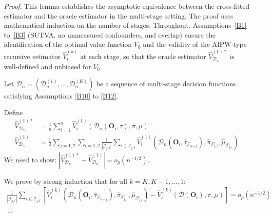 \documentclass[11pt]{article}
\theoremstyle{referenceplain}
\theoremstyle{referencedefinition}
\theoremstyle{referenceremark}
\begin{document}
\begin{proof}
This lemma establishes the asymptotic equivalence between the cross-fitted estimator and the oracle estimator in the multi-stage setting. The proof uses mathematical induction on the number of stages. Throughout, Assumptions~\ref{B1} to~\ref{B3} (SUTVA, no unmeasured confounders, and overlap) ensure the identification of the optimal value function $V_0$ and the validity of the AIPW-type recursive estimator $\widehat{V}_i^{(k)}$ at each stage, so that the oracle estimator $\widehat{V}_{\mathcal{D}_n}^{(1)*}$ is well-defined and unbiased for $V_0$.

Let $\mathcal{D}_n = (\mathcal{D}_n^{(1)}, \ldots, \mathcal{D}_n^{(K)})$ be a sequence of multi-stage decision functions satisfying Assumptions \ref{B10} to \ref{B12}.

Define
\begin{align}
    \widehat{V}_{\mathcal{D}_n}^{(1)*} &= \frac{1}{n}\sum_{i=1}^n \widehat{V}_i^{(1)}(\mathcal{D}_n(\mathbf{O}_i,\tau),\pi,\mu)\label{multi-oracle-est}\\
    \widehat{V}_{\mathcal{D}_n}^{(1)} &= \frac{1}{4}\sum_{j=1,2}\sum_{l=1,2}\frac{1}{|\mathcal{I}_{j,l}|}\sum_{i\in\mathcal{I}_{j,l}}\widehat{V}_i^{(1)}(\mathcal{D}_n(\mathbf{O}_i,\widehat{\tau}_{\mathcal{I}_{3-j}}),\widehat{\pi}_{\mathcal{I}_{j,l}^c},\widehat{\mu}_{\mathcal{I}_{j,l}^c})\label{multi-cross-est}
\end{align}
We need to show: $|\widehat{V}_{\mathcal{D}_n}^{(1)*} - \widehat{V}_{\mathcal{D}_n}^{(1)}| = o_p(n^{-1/2})$.

We prove by strong induction that for all $k = K, K-1, \ldots, 1$:
\begin{align}
    \frac{1}{|\mathcal{I}_{j,l}|}\sum_{i\in\mathcal{I}_{j,l}}\left[\widehat{V}_i^{(k)}(\mathcal{D}_n(\mathbf{O}_i,\widehat{\tau}_{\mathcal{I}_{3-j}}),\widehat{\pi}_{\mathcal{I}_{j,l}^c},\widehat{\mu}_{\mathcal{I}_{j,l}^c}) - \widehat{V}_i^{(k)}(\mathcal{D}(\mathbf{O}_i),\pi,\mu)\right] = o_p(n^{-1/2})\label{multi-induct-hyp}
\end{align}


\end{proof}
\end{document}
